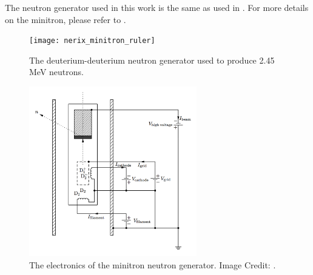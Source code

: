 The neutron generator used in this work is the same as used in .  For more details on the minitron, please refer to .


\begin{figure}[t]
        \centering
	\texttt{[image: nerix\_minitron\_ruler]}
	\caption{The deuterium-deuterium neutron generator used to produce 2.45 MeV neutrons.}
	\label{fig:nerix_minitron_ruler}
\end{figure}


\begin{figure}[bt]
        \centering
	\includegraphics[width=0.65\textwidth]{nerix_minitron_schematic}
	\caption{The electronics of the minitron neutron generator.  Image Credit: .}
	\label{fig:nerix_minitron_schematic}
\end{figure}


